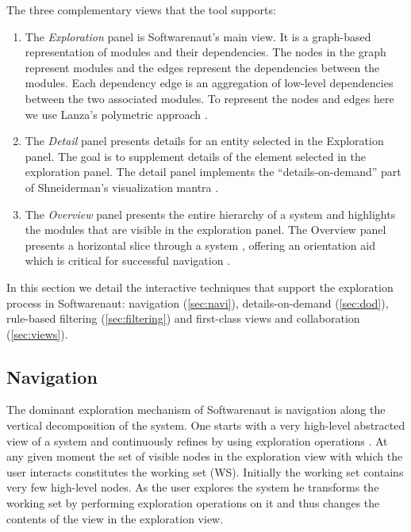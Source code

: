 \documentclass[preprint,12pt]{elsarticle}
\begin{document}
The three complementary views that the tool supports:

\begin{enumerate}

\item The {\em Exploration} panel is Softwarenaut's main view. It is a graph-based representation of modules and their dependencies. The nodes in the graph represent modules and the edges represent the dependencies between the modules. Each dependency edge is an aggregation of low-level dependencies between the two associated modules. To represent the nodes and edges here we use Lanza's polymetric approach \cite{lanza-pv, lanza-oomp}. 

\item The {\em Detail} panel presents details for an entity selected in the Exploration panel. The goal is to supplement details of the element selected in the exploration panel. The detail panel implements the ``details-on-demand'' part of Shneiderman's visualization mantra \cite{shneid-eyes}.

\item The {\em Overview} panel presents the entire hierarchy of a system and highlights the modules that are visible in the exploration panel. The Overview panel presents a horizontal slice through a system \cite{wong-thesis}, offering an orientation aid which is critical for successful navigation \cite{storey-awareness}.

\end{enumerate}

In this section we detail the interactive techniques that support the exploration process in Softwarenaut: navigation (\ref{sec:navi}), details-on-demand (\ref{sec:dod}), rule-based filtering (\ref{sec:filtering}) and first-class views and collaboration (\ref{sec:views}).  

\subsection{Navigation} 

The dominant exploration mechanism of Softwarenaut is navigation along the vertical decomposition of the system. One starts with a very high-level abstracted view of a system and continuously refines by using exploration operations \cite{robertson-conetrees}. At any given moment the set of visible nodes in the exploration view with which the user interacts constitutes the working set (WS). Initially the working set contains very few high-level nodes. As the user explores the system he transforms the working set by performing exploration operations on it and thus changes the contents of the view in the exploration view.
\end{document}
